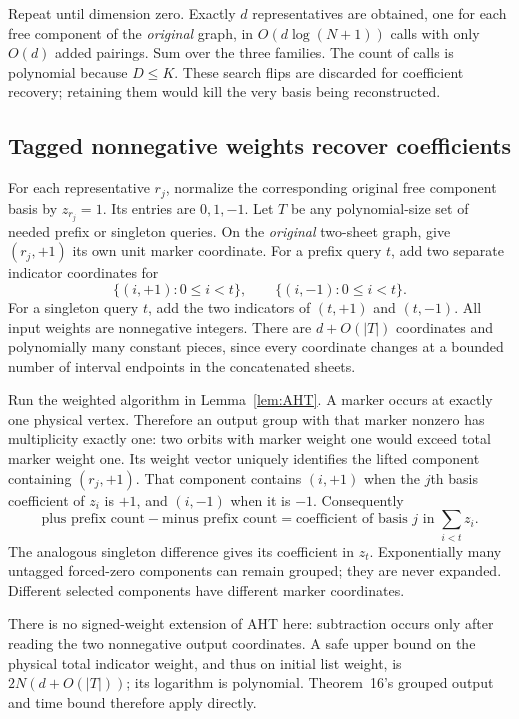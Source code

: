 \documentclass[11pt]{article}
\begin{document}
Repeat until dimension zero. Exactly $d$ representatives are obtained, one for each free component of the \emph{original} graph, in $O(d\log(N+1))$ calls with only $O(d)$ added pairings. Sum over the three families. The count of calls is polynomial because $D\leq K$. These search flips are discarded for coefficient recovery; retaining them would kill the very basis being reconstructed.

\subsection{Tagged nonnegative weights recover coefficients}
For each representative $r_j$, normalize the corresponding original free component basis by $z_{r_j}=1$. Its entries are $0,1,-1$. Let $T$ be any polynomial-size set of needed prefix or singleton queries. On the \emph{original} two-sheet graph, give $(r_j,+1)$ its own unit marker coordinate. For a prefix query $t$, add two separate indicator coordinates for
\[
 \{(i,+1):0\leq i<t\},\qquad \{(i,-1):0\leq i<t\}.
\]
For a singleton query $t$, add the two indicators of $(t,+1)$ and $(t,-1)$. All input weights are nonnegative integers. There are $d+O(|T|)$ coordinates and polynomially many constant pieces, since every coordinate changes at a bounded number of interval endpoints in the concatenated sheets.

Run the weighted algorithm in Lemma~\ref{lem:AHT}. A marker occurs at exactly one physical vertex. Therefore an output group with that marker nonzero has multiplicity exactly one: two orbits with marker weight one would exceed total marker weight one. Its weight vector uniquely identifies the lifted component containing $(r_j,+1)$. That component contains $(i,+1)$ when the $j$th basis coefficient of $z_i$ is $+1$, and $(i,-1)$ when it is $-1$. Consequently
\begin{equation}\label{eq:counts}
 \text{plus prefix count}-\text{minus prefix count}
 =\text{coefficient of basis }j\text{ in }\sum_{i<t}z_i.
\end{equation}
The analogous singleton difference gives its coefficient in $z_t$. Exponentially many untagged forced-zero components can remain grouped; they are never expanded. Different selected components have different marker coordinates.

There is no signed-weight extension of AHT here: subtraction occurs only after reading the two nonnegative output coordinates. A safe upper bound on the physical total indicator weight, and thus on initial list weight, is $2N(d+O(|T|))$; its logarithm is polynomial. Theorem~16's grouped output and time bound therefore apply directly.
\end{document}
